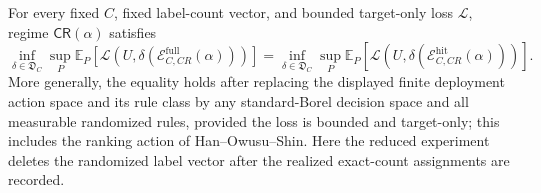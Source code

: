 For every fixed \(C\), fixed label-count vector, and bounded target-only loss \(\mathcal L\), regime \(\mathsf{CR}(\alpha)\) satisfies
\[
\inf_{\delta\in\mathfrak D_C}\sup_P\mathbb E_P[\mathcal L(U,\delta(\mathcal E_{C,CR}^{\mathrm{full}}(\alpha)))]
=
\inf_{\delta\in\mathfrak D_C}\sup_P\mathbb E_P[\mathcal L(U,\delta(\mathcal E_{C,CR}^{\mathrm{hit}}(\alpha)))].
\]
More generally, the equality holds after replacing the displayed finite deployment action space and its rule class by any standard-Borel decision space and all measurable randomized rules, provided the loss is bounded and target-only; this includes the ranking action of Han--Owusu--Shin.  Here the reduced experiment deletes the randomized label vector after the realized exact-count assignments are recorded.